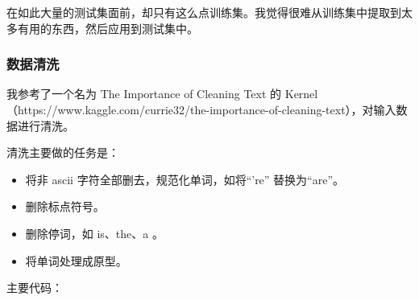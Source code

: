 \documentclass{article}
\begin{document}
在如此大量的测试集面前，却只有这么点训练集。我觉得很难从训练集中提取到太多有用的东西，然后应用到测试集中。

\subsubsection{数据清洗}

我参考了一个名为 The Importance of Cleaning Text 的 Kernel （https://www.kaggle.com/currie32/the-importance-of-cleaning-text），对输入数据进行清洗。

清洗主要做的任务是：

\begin{itemize}
\item 将非 ascii 字符全部删去，规范化单词，如将“'re” 替换为“are”。
\item 删除标点符号。
\item 删除停词，如 is、the、a 。
\item 将单词处理成原型。
\end{itemize}

主要代码：
\end{document}
